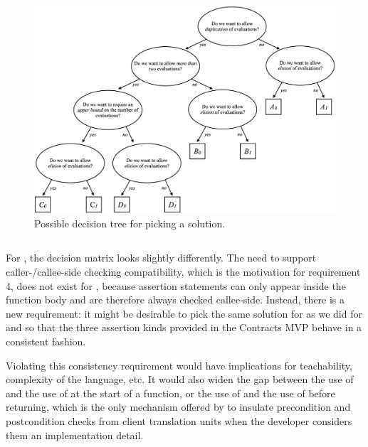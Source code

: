 \begin{figure}%
\centering
  \includegraphics[width=1\linewidth]{images/p3228_fig1.png}
  \vspace{2mm}
  \caption{Possible decision tree for picking a solution.}
  \label{fig:prepost}
\end{figure}


\subsection{}
For , the decision matrix looks slightly differently. The need to support caller-/callee-side checking compatibility, which is the motivation for requirement 4, does not exist for , because assertion statements can only appear inside the function body and are therefore always checked callee-side. Instead, there is a new requirement: it might be desirable to pick the same solution for  as we did for  and  so that the three assertion kinds provided in the Contracts MVP behave in a consistent fashion.

Violating this consistency requirement would have implications for teachability, complexity of the language, etc. It would also widen the gap between the use of  and the use of  at the start
of a function, or the use of  and the use of  before returning, which is the only mechanism offered by \cite{P2900R6} to insulate precondition and postcondition checks from client translation units when the developer considers them an implementation detail.

